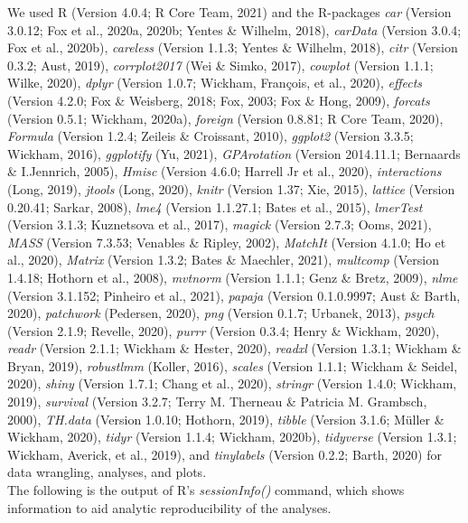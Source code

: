 \documentclass[
  english,
  man, noextraspace,floatsintext]{apa7}
\begin{document}
\begin{appendix}
We used R (Version 4.0.4; R Core Team, 2021) and the R-packages
\emph{car} (Version 3.0.12; Fox et al., 2020a, 2020b; Yentes \& Wilhelm,
2018), \emph{carData} (Version 3.0.4; Fox et al., 2020b),
\emph{careless} (Version 1.1.3; Yentes \& Wilhelm, 2018), \emph{citr}
(Version 0.3.2; Aust, 2019), \emph{corrplot2017} (Wei \& Simko, 2017),
\emph{cowplot} (Version 1.1.1; Wilke, 2020), \emph{dplyr} (Version
1.0.7; Wickham, François, et al., 2020), \emph{effects} (Version 4.2.0;
Fox \& Weisberg, 2018; Fox, 2003; Fox \& Hong, 2009), \emph{forcats}
(Version 0.5.1; Wickham, 2020a), \emph{foreign} (Version 0.8.81; R Core
Team, 2020), \emph{Formula} (Version 1.2.4; Zeileis \& Croissant, 2010),
\emph{ggplot2} (Version 3.3.5; Wickham, 2016), \emph{ggplotify} (Yu,
2021), \emph{GPArotation} (Version 2014.11.1; Bernaards \& I.Jennrich,
2005), \emph{Hmisc} (Version 4.6.0; Harrell Jr et al., 2020),
\emph{interactions} (Long, 2019), \emph{jtools} (Long, 2020),
\emph{knitr} (Version 1.37; Xie, 2015), \emph{lattice} (Version 0.20.41;
Sarkar, 2008), \emph{lme4} (Version 1.1.27.1; Bates et al., 2015),
\emph{lmerTest} (Version 3.1.3; Kuznetsova et al., 2017), \emph{magick}
(Version 2.7.3; Ooms, 2021), \emph{MASS} (Version 7.3.53; Venables \&
Ripley, 2002), \emph{MatchIt} (Version 4.1.0; Ho et al., 2020),
\emph{Matrix} (Version 1.3.2; Bates \& Maechler, 2021), \emph{multcomp}
(Version 1.4.18; Hothorn et al., 2008), \emph{mvtnorm} (Version 1.1.1;
Genz \& Bretz, 2009), \emph{nlme} (Version 3.1.152; Pinheiro et al.,
2021), \emph{papaja} (Version 0.1.0.9997; Aust \& Barth, 2020),
\emph{patchwork} (Pedersen, 2020), \emph{png} (Version 0.1.7; Urbanek,
2013), \emph{psych} (Version 2.1.9; Revelle, 2020), \emph{purrr}
(Version 0.3.4; Henry \& Wickham, 2020), \emph{readr} (Version 2.1.1;
Wickham \& Hester, 2020), \emph{readxl} (Version 1.3.1; Wickham \&
Bryan, 2019), \emph{robustlmm} (Koller, 2016), \emph{scales} (Version
1.1.1; Wickham \& Seidel, 2020), \emph{shiny} (Version 1.7.1; Chang et
al., 2020), \emph{stringr} (Version 1.4.0; Wickham, 2019),
\emph{survival} (Version 3.2.7; Terry M. Therneau \& Patricia M.
Grambsch, 2000), \emph{TH.data} (Version 1.0.10; Hothorn, 2019),
\emph{tibble} (Version 3.1.6; Müller \& Wickham, 2020), \emph{tidyr}
(Version 1.1.4; Wickham, 2020b), \emph{tidyverse} (Version 1.3.1;
Wickham, Averick, et al., 2019), and \emph{tinylabels} (Version 0.2.2;
Barth, 2020) for data wrangling, analyses, and plots.\\
The following is the output of R's \emph{sessionInfo()} command, which
shows information to aid analytic reproducibility of the analyses.


\end{appendix}
\end{document}
